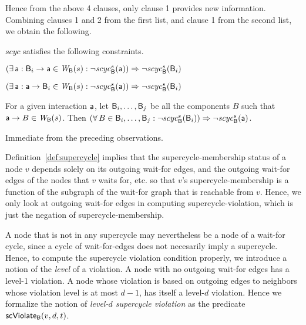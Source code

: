 \en
Hence from the above 4 clauses, only clause 1 provides new information. 
Combining clauses 1 and 2 from the first list, and clause 1 from the second list, we obtain the following. 


\label{prop:sc-membership}
$scyc$ satisfies the following constraints.
\bn

\item \label{prop:sc-membership:comp-out}
$(\exists\, \mathsf{a}: \mathsf{B}_i \rightarrow \mathsf{a} \in \mathit{W}_{\mathsf{B}}({s}) : \neg \mathit{scyc}_{\mathsf{B}}^{s}({\mathsf{a}})) \Rightarrow \neg \mathit{scyc}_{\mathsf{B}}^{s}({\mathsf{B}_i})$

\item \label{prop:sc-membership:comp-in}
$(\exists\, \mathsf{a}: \mathsf{a} \rightarrow \mathsf{B}_i \in \mathit{W}_{\mathsf{B}}({s}): \neg \mathit{scyc}_{\mathsf{B}}^{s}({\mathsf{a}})) \Rightarrow \neg \mathit{scyc}_{\mathsf{B}}^{s}({\mathsf{B}_i})$


\item \label{prop:sc-membership:act-out}
For a given interaction $\mathsf{a}$, let $\mathsf{B}_i,\ldots,\mathsf{B}_j$ be all the components $B$ such that $\mathsf{a} \rightarrow B \in \mathit{W}_{\mathsf{B}}({s})$.
Then $(\forall\, B \in \mathsf{B}_i,\ldots,\mathsf{B}_j: \neg \mathit{scyc}_{\mathsf{B}}^{s}({\mathsf{B}_i})) \Rightarrow \neg \mathit{scyc}_{\mathsf{B}}^{s}({\mathsf{a}})$.
\en

\ep
%
\bpr
Immediate from the preceding observations.
\epr


Definition~\ref{def:supercycle} implies that the supercycle-membership status of a node $v$ depends
solely on its outgoing wait-for edges, and the outgoing wait-for edges of the nodes that $v$ waits
for, etc. so that $v$'s supercycle-membership is a function of the subgraph of the wait-for graph
that is reachable from $v$.  Hence, we only look at outgoing wait-for edges in computing
supercycle-violation, which is just the negation of supercycle-membership.



A node that is not in any supercycle may nevertheless be a node of a wait-for cycle, since a cycle
of wait-for-edges does not necesarily imply a supercycle. Hence, to compute the supercycle violation
condition properly, we introduce a notion of the \emph{level} of a violation. A node with no
outgoing wait-for edges has a level-1 violation. A node whose violation is based on outgoing edges
to neighbors whose violation level is at most $d-1$, has itself a level-$d$ violation.  Hence we
formalize the notion of \emph{level-$d$ supercycle violation} as the predicate $\mathsf{scViolate}_{\mathsf{B}}(v,d,t)$.



